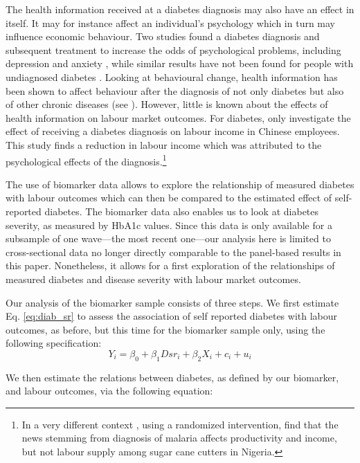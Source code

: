 The health information received at a diabetes diagnosis may also have an effect in itself. It may for instance affect an individual's psychology which in turn may influence economic behaviour. Two studies found a diabetes diagnosis and subsequent treatment to increase the odds of psychological problems, including depression and anxiety \parencite{Thoolen2006,Paddison2011}, while similar results have not been found for people with undiagnosed diabetes \parencite{Nouwen2011}. Looking at behavioural change, health information  has been shown to affect behaviour after the diagnosis of not only diabetes \parencite{Slade2012} but also of other chronic diseases (see \textcite{Baird2014,Gong2015,Thornton2008,Zhao2013a}). However, little is known about the effects of health information on labour market outcomes. For diabetes, only \textcite{Liu2014} investigate the effect of receiving a diabetes diagnosis on labour income in Chinese employees. This study finds a reduction in labour income which was attributed to the psychological effects of the diagnosis.\footnote{In a very different context \textcite{Dillon2014}, using a randomized intervention, find that the news stemming from diagnosis of malaria affects productivity and income, but not labour supply among sugar cane cutters in Nigeria.} 


The use of biomarker data allows to explore the relationship of measured diabetes with labour outcomes which can then be compared to the estimated effect of self-reported diabetes. The biomarker data also enables us to look at diabetes severity, as measured by \ac{HbA1c} values. Since this data is only available for a subsample of one wave---the most recent one---our analysis here is limited to cross-sectional data no longer directly comparable to the panel-based results in this paper. Nonetheless, it allows for a first exploration of the relationships of measured diabetes and disease severity with labour market outcomes. 

Our analysis of the biomarker sample consists of three steps. We first estimate Eq. \ref{eq:diab_sr} to assess the association of self reported diabetes with labour outcomes, as before, but this time for the biomarker sample only, using the following specification:
\begin{equation}
Y_{i}=\beta_{0}+\beta_{1}Dsr_{i}+\beta_{2}X_{i}+c_{i}+u_{i}\label{eq:diab_sr}
\end{equation}

We then estimate the relations between diabetes, as defined by our biomarker, and labour outcomes, via the following equation:

